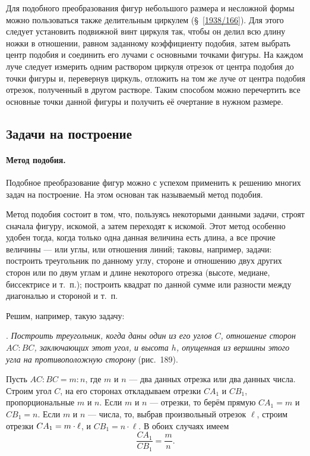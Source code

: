 \documentclass[oneside]{book}
\begin{document}
Для подобного преобразования фигур небольшого размера и несложной формы можно пользоваться также делительным циркулем (§~\ref{1938/166}).
Для этого следует установить подвижной винт циркуля так, чтобы он делил всю длину ножки в отношении, равном заданному коэффициенту подобия, затем выбрать центр подобия и соединить его лучами с основными точками фигуры.
На каждом луче следует измерить одним раствором циркуля отрезок от центра подобия до точки фигуры и, перевернув циркуль, отложить на том же луче от центра подобия отрезок, полученный в другом растворе.
Таким способом можно перечертить все основные точки данной фигуры и получить её очертание в нужном размере.

\subsection*{Задачи на построение}

\paragraph{Метод подобия.}\label{1938/181}
Подобное преобразование фигур можно с успехом применить к решению многих задач на построение.
На этом основан так называемый метод подобия.

Метод подобия состоит в том, что, пользуясь некоторыми данными задачи, строят сначала фигуру,  искомой, а затем переходят к искомой.
Этот метод особенно удобен тогда, когда только одна данная величина есть длина, а все прочие величины — или углы, или отношения линий;
таковы, например, задачи:
построить треугольник по данному углу, стороне и отношению двух других сторон или по двум углам и длине некоторого отрезка (высоте, медиане, биссектрисе и т.~п.);
построить квадрат по данной сумме или разности между диагональю и стороной и т.~п.

Решим, например, такую задачу:

.
\emph{Построить треугольник, когда даны один из его углов $C$, отношение сторон $AC:BC$, заключающих этот угол, и высота $h$, опущенная из вершины этого угла на противоположную сторону} (рис.~189).

Пусть $AC:BC=m:n$, где $m$ и $n$ — два данных отрезка или два данных числа.
Строим угол $C$, на его сторонах откладываем отрезки $CA_1$ и $CB_1$, пропорциональные $m$ и $n$.
Если $m$ и $n$ — отрезки, то берём прямую $CA_1=m$ и $CB_1=n$.
Если $m$ и $n$ — числа, то, выбрав произвольный отрезок $\ell$, строим отрезки $CA_1\z=m \cdot \ell$, и $CB_1=n\cdot \ell$.
В обоих случаях имеем
\[\frac{CA_1}{CB_1} = \frac mn.\]
\end{document}
